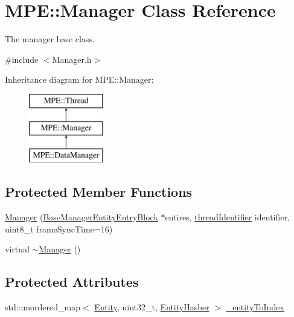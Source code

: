 \hypertarget{class_m_p_e_1_1_manager}{}\section{M\+PE\+:\+:Manager Class Reference}
\label{class_m_p_e_1_1_manager}


The manager base class.  




{\ttfamily \#include $<$Manager.\+h$>$}

Inheritance diagram for M\+PE\+:\+:Manager\+:\begin{figure}[H]
\begin{center}
\leavevmode
\includegraphics[height=3.000000cm]{class_m_p_e_1_1_manager}
\end{center}
\end{figure}
\subsection*{Protected Member Functions}
\begin{DoxyCompactItemize}
\item 
\hyperlink{class_m_p_e_1_1_manager_a16591d627df08536ce27b7d791347269}{Manager} (\hyperlink{struct_m_p_e_1_1_base_manager_entity_entry_block}{Base\+Manager\+Entity\+Entry\+Block} $\ast$entires, \hyperlink{namespace_m_p_e_a16447295e3105bd2ba2a9ea303566175}{thread\+Identifier} identifier, uint8\+\_\+t frame\+Sync\+Time=16)
\item 
virtual \hyperlink{class_m_p_e_1_1_manager_a6bf168edb75ff564f1dee7a9869798f0}{$\sim$\+Manager} ()
\end{DoxyCompactItemize}
\subsection*{Protected Attributes}
\begin{DoxyCompactItemize}
\item 
std\+::unordered\+\_\+map$<$ \hyperlink{struct_m_p_e_1_1_entity}{Entity}, uint32\+\_\+t, \hyperlink{struct_m_p_e_1_1_entity_hasher}{Entity\+Hasher} $>$ \hyperlink{class_m_p_e_1_1_manager_a142d48cdd0daf0b9ad667ea599de586a}{\+\_\+entity\+To\+Index}
\end{DoxyCompactItemize}
